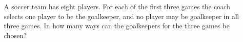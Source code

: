A soccer team has eight players. For each of the first three games the coach selects one player to be the goalkeeper, and no player may be goalkeeper in all three games. In how many ways can the goalkeepers for the three games be chosen?
